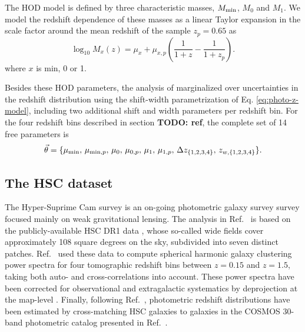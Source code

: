 \documentclass[a4paper,11pt]{article}
\newcommand{\todo}[1]{{\bf TODO: #1}}
\begin{document}
      The HOD model is defined by three characteristic masses, $M_{\rm min}$, $M_0$ and $M_1$. We model the redshift dependence of these masses as a linear Taylor expansion in the scale factor around the mean redshift of the sample $z_p=0.65$ as
      \begin{equation}
        \log_{10}{M_x(z)} = \mu_x + \mu_{x, p} \left(\frac{1}{1+z} - \frac{1}{1+z_{p}}\right).
      \end{equation}
      where $x$ is $\mathrm{min}$, 0 or 1.
    
      Besides these HOD parameters, the analysis of \cite{1912.08209} marginalized over uncertainties in the redshift distribution using the shift-width parametrization of Eq. \ref{eq:photo-z-model}, including two additional shift and width parameters per redshift bin. For the four redshift bins described in section \todo{ref}, the complete set of 14 free parameters is
      \begin{equation}
        \vec{\theta}=\{\mu_{\rm min},\,\mu_{{\rm min},p},\,\mu_0,\,\mu_{0,p},\,\mu_1,\,\mu_{1,p},\,\Delta z_{\{1,2,3,4\}},\,z_{w,\{1,2,3,4\}}\}.
      \end{equation}

    \subsection{The HSC dataset}\label{ssec:hsc.data}
      The Hyper-Suprime Cam survey is an on-going photometric galaxy survey survey focused mainly on weak gravitational lensing. The analysis in Ref.~\cite{1912.08209} is based on the publicly-available HSC DR1 data \cite{2018PASJ...70S...8A}, whose so-called wide fields cover approximately 108 square degrees on the sky, subdivided into seven distinct patches. Ref.~\cite{1912.08209} used these data to compute spherical harmonic galaxy clustering power spectra for four tomographic redshift bins between $z=0.15$ and $z=1.5$, taking both auto- and cross-correlations into account. These power spectra have been corrected for observational and extragalactic systematics by deprojection at the map-level \cite{2019MNRAS.484.4127A}. Finally, following Ref.~\cite{2019PASJ...71...43H}, photometric redshift distributions have been estimated by cross-matching HSC galaxies to galaxies in the COSMOS 30-band photometric catalog presented in Ref.~\cite{2016ApJS..224...24L}.
\end{document}
